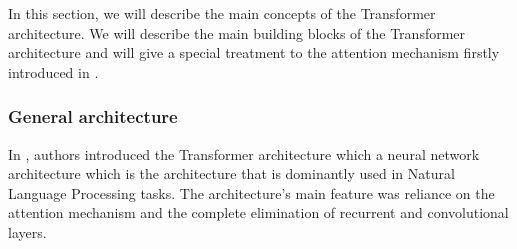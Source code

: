 \documentclass[a4paper, twoside]{report}
\theoremstyle{definition}
\numberwithin{equation}{section}
\begin{document}
In this section, we will describe the main concepts of the Transformer architecture.
We will describe the main building blocks of the Transformer architecture
and will give a special treatment to the attention mechanism firstly introduced in \cite{1409.0473}.


\subsubsection{General architecture}

In \cite{1706.03762}, authors introduced the Transformer architecture which a neural network architecture
which is the architecture that is dominantly used in Natural Language Processing tasks.
The architecture's main feature was reliance on the attention mechanism and the complete elimination
of recurrent and convolutional layers.
\end{document}
